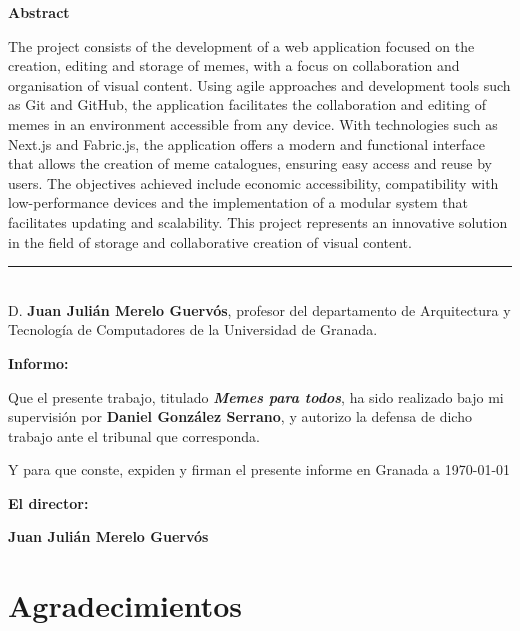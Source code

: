 \noindent\textbf{Abstract}

The project consists of the development of a web application focused on the creation, editing and storage of memes, with a focus on collaboration and organisation of visual content. Using agile approaches and development tools such as Git and GitHub, the application facilitates the collaboration and editing of memes in an environment accessible from any device. With technologies such as Next.js and Fabric.js, the application offers a modern and functional interface that allows the creation of meme catalogues, ensuring easy access and reuse by users. The objectives achieved include economic accessibility, compatibility with low-performance devices and the implementation of a modular system that facilitates updating and scalability. This project represents an innovative solution in the field of storage and collaborative creation of visual content.

\cleardoublepage

\thispagestyle{empty}

\noindent\hspace*{-\parindent}\rule[-1ex]{\textwidth}{2pt}\\[4.5ex]

D. \textbf{Juan Julián Merelo Guervós}, profesor del departamento de Arquitectura y Tecnología de Computadores de la Universidad de Granada.

\vspace{0.5cm}

\textbf{Informo:}

\vspace{0.5cm}

Que el presente trabajo, titulado \textit{\textbf{Memes para todos}},
ha sido realizado bajo mi supervisión por \textbf{Daniel González Serrano}, y autorizo la defensa de dicho trabajo ante el tribunal
que corresponda.

\vspace{0.5cm}

Y para que conste, expiden y firman el presente informe en Granada a \today

\vspace{1cm}

\textbf{El director: }

\vspace{5cm}

\noindent \textbf{Juan Julián Merelo Guervós}

\chapter*{Agradecimientos}





